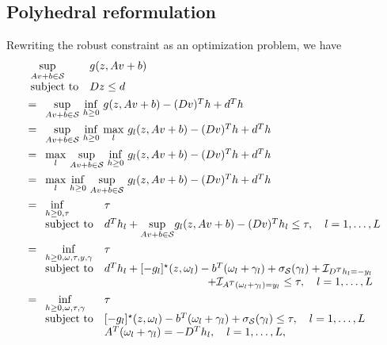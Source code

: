 \subsection{Polyhedral reformulation}
\label{apx:polyproof}
Rewriting the robust constraint as an optimization problem, we have
\begin{equation*}
	\begin{aligned}
& \begin{array}[t]{ll}
	\underset{Av+b\in \supp}{\sup} & g(z,Av+b) \\
	\mbox{subject to} & Dz \le d
\end{array}\\
&= \begin{array}[t]{ll}
	\underset{Av+b\in \supp}{\sup} ~\underset{h \geq 0}{\inf} ~g(z,Av+b)  - (Dv)^Th   + d^Th\\
	\end{array}\\
	&= \begin{array}[t]{ll}
		\underset{Av+b\in \supp}{\sup}~\underset{h \geq 0}{\inf}~\underset{l}{\max}~g_l(z,Av+b)  - (Dv)^Th   + d^Th\\
		\end{array}\\
		&= \begin{array}[t]{ll}
			\underset{l}{\max}~\underset{Av+b\in \supp}{\sup}~\underset{h \geq 0}{\inf}~g_l(z,Av+b)  - (Dv)^Th   + d^Th\\
			\end{array}\\
		&= \begin{array}[t]{ll}
				\underset{l}{\max}~\underset{h \geq 0}{\inf}~\underset{Av+b\in \supp}{\sup}~g_l(z,Av+b)  - (Dv)^Th   + d^Th\\
				\end{array}\\
&= \begin{array}[t]{ll}
	\underset{h\geq 0,\tau}{\inf} & \tau \\
	\mbox{subject to}& d^Th_l + \underset{Av+b\in \supp}{\sup } g_l(z,Av+b) - (Dv)^Th_l \leq \tau, \quad l = 1,\dots,L
\end{array}\\
&= \begin{array}[t]{ll}
	\underset{h \geq 0, \omega,\tau, y, \gamma}{\inf} &\tau\\
	\mbox{subject to}& d^Th_l + [-g_l]^\star(z,\omega_l) - b^T(\omega_l + \gamma_l) + \sigma_\supp(\gamma_l) + \indicator_{D^Th_l = -y_l} \\
 &\hfill  + \indicator_{A^T(\omega_l+ \gamma_l) = y_l} \leq \tau, \quad l = 1,\dots,L
\end{array}\\
&= \begin{array}[t]{ll}
	\underset{h \geq 0,\omega,\tau,\gamma}{\inf} &\tau\\
	\mbox{subject to}& [-g_l]^\star(z,\omega_l) - b^T(\omega_l + \gamma_l) + \sigma_\supp(\gamma_l) \leq \tau, \quad l = 1,\dots,L\\
	& A^T(\omega_l+ \gamma_l) = -D^Th_l,\quad l = 1,\dots,L,
\end{array}\\
\end{aligned}
\end{equation*}
